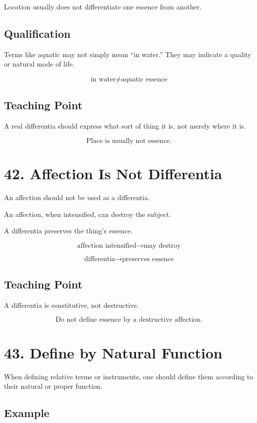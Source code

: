 \documentclass[12pt]{article}
\begin{document}
Location usually does not differentiate one essence from another.

\subsection*{Qualification}

Terms like aquatic may not simply mean ``in water.'' They may indicate a
quality or natural mode of life.

\[
\text{in water} \neq \text{aquatic essence}
\]

\subsection*{Teaching Point}

A real differentia should express what sort of thing it is, not merely where it
is.

\[
\boxed{
\text{Place is usually not essence.}
}
\]

\section*{42. Affection Is Not Differentia}

An affection should not be used as a differentia.

An affection, when intensified, can destroy the subject.

A differentia preserves the thing's essence.

\[
\text{affection intensified} \rightarrow \text{may destroy}
\]

\[
\text{differentia} \rightarrow \text{preserves essence}
\]

\subsection*{Teaching Point}

A differentia is constitutive, not destructive.

\[
\boxed{
\text{Do not define essence by a destructive affection.}
}
\]

\section*{43. Define by Natural Function}

When defining relative terms or instruments, one should define them according to
their natural or proper function.

\subsection*{Example}
\end{document}
